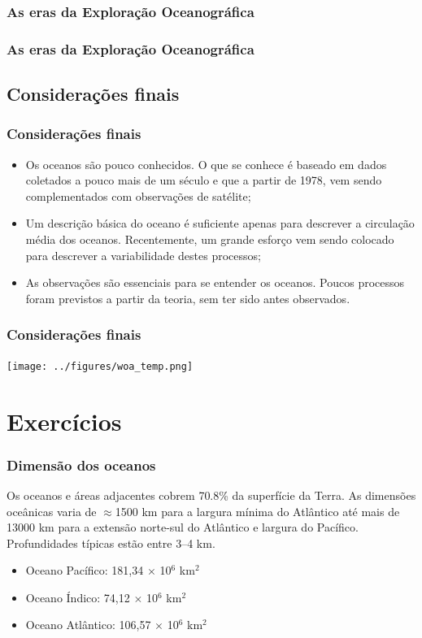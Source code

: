 \begin{frame}
    \frametitle{As eras da Exploração Oceanográfica}
    \centerline{}
\end{frame}

\begin{frame}
    \frametitle{As eras da Exploração Oceanográfica}
    \centerline{}
\end{frame}

\subsection{Considerações finais}
\begin{frame}
    \frametitle{Considerações finais}
\small{
    \begin{itemize}[<+-| alert@+>]
        \item Os oceanos são pouco conhecidos.  O que se conhece é baseado em
              dados coletados a pouco mais de um século e que a partir de 1978,
              vem sendo complementados com observações de satélite;
        \item Um descrição básica do oceano é suficiente apenas para descrever
              a circulação média dos oceanos.  Recentemente, um grande esforço
              vem sendo colocado para descrever a variabilidade destes processos;
        \item As observações são essenciais para se entender os oceanos.
              Poucos processos foram previstos a partir da teoria, sem ter sido antes observados.
    \end{itemize}
}
\end{frame}

\begin{frame}
    \frametitle{Considerações finais}
    \centerline{\texttt{[image: ../figures/woa\_temp.png]}}
\end{frame}

\section{Exercícios}
\begin{frame}
    \frametitle{Dimensão dos oceanos}

    \small{Os oceanos e áreas adjacentes cobrem 70.8\% da superfície da Terra.
    As dimensões oceânicas varia de $\approx$1500 km para a largura mínima do
    Atlântico até mais de 13000 km para a extensão norte-sul do Atlântico e
    largura do Pacífico.  Profundidades típicas estão entre 3--4 km.}

    \begin{itemize}[<+-| alert@+>]
        \item Oceano Pacífico: 181,34 $\times$ 10$^6$ km$^2$
        \item Oceano Índico: 74,12 $\times$ 10$^6$ km$^2$
        \item Oceano Atlântico: 106,57 $\times$ 10$^6$ km$^2$
    \end{itemize}
\end{frame}


